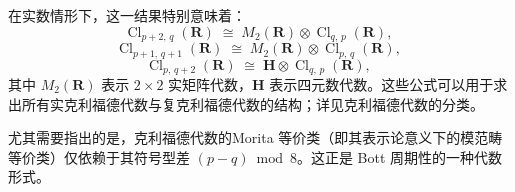 在实数情形下，这一结果特别意味着：
$$
\operatorname{Cl}_{p+2,\,q}(\mathbf{R}) \;\cong\; M_2(\mathbf{R}) \otimes \operatorname{Cl}_{q,\,p}(\mathbf{R}),~
$$
$$
\operatorname{Cl}_{p+1,\,q+1}(\mathbf{R}) \;\cong\; M_2(\mathbf{R}) \otimes \operatorname{Cl}_{p,\,q}(\mathbf{R}),~
$$
$$
\operatorname{Cl}_{p,\,q+2}(\mathbf{R}) \;\cong\; \mathbf{H} \otimes \operatorname{Cl}_{q,\,p}(\mathbf{R}),~
$$
其中 $M_2(\mathbf{R})$ 表示 $2 \times 2$ 实矩阵代数，$\mathbf{H}$ 表示四元数代数。这些公式可以用于求出所有实克利福德代数与复克利福德代数的结构；详见克利福德代数的分类。

尤其需要指出的是，克利福德代数的Morita 等价类（即其表示论意义下的模范畴等价类）仅依赖于其符号型差 $(p - q) \bmod 8$。这正是 Bott 周期性的一种代数形式。

